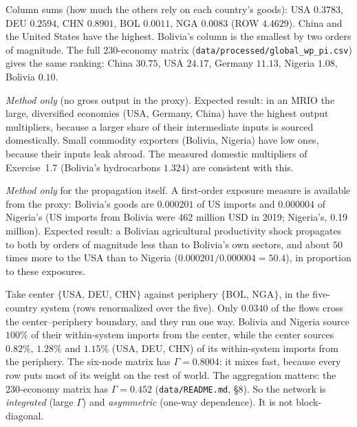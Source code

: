 \documentclass[../solutions_manual.tex]{subfiles}
\begin{document}
 Column sums (how much the others rely on each country's goods): USA $0.3783$, DEU $0.2594$, CHN $0.8901$, BOL $0.0011$, NGA $0.0083$ (ROW $4.4629$). China and the United States have the highest. Bolivia's column is the smallest by two orders of magnitude. The full 230-economy matrix (\texttt{data/processed/global\_wp\_pi.csv}) gives the same ranking: China $30.75$, USA $24.17$, Germany $11.13$, Nigeria $1.08$, Bolivia $0.10$.

 \emph{Method only} (no gross output in the proxy). Expected result: in an MRIO the large, diversified economies (USA, Germany, China) have the highest output multipliers, because a larger share of their intermediate inputs is sourced domestically. Small commodity exporters (Bolivia, Nigeria) have low ones, because their inputs leak abroad. The measured domestic multipliers of Exercise~1.7 (Bolivia's hydrocarbons $1.324$) are consistent with this.

 \emph{Method only} for the propagation itself. A first-order exposure measure is available from the proxy: Bolivia's goods are $0.000201$ of US imports and $0.000004$ of Nigeria's (US imports from Bolivia were 462 million USD in 2019; Nigeria's, 0.19 million). Expected result: a Bolivian agricultural productivity shock propagates to both by orders of magnitude less than to Bolivia's own sectors, and about $50$ times more to the USA than to Nigeria ($0.000201/0.000004 = 50.4$), in proportion to these exposures.

 Take center $\{$USA, DEU, CHN$\}$ against periphery $\{$BOL, NGA$\}$, in the five-country system (rows renormalized over the five). Only $0.0340$ of the flows cross the center--periphery boundary, and they run one way. Bolivia and Nigeria source $100\%$ of their within-system imports from the center, while the center sources $0.82\%$, $1.28\%$ and $1.15\%$ (USA, DEU, CHN) of its within-system imports from the periphery. The six-node matrix has $\Gamma = 0.8004$: it mixes fast, because every row puts most of its weight on the rest of world. The aggregation matters: the 230-economy matrix has $\Gamma = 0.452$ (\texttt{data/README.md}, \S8). So the network is \emph{integrated} (large $\Gamma$) and \emph{asymmetric} (one-way dependence). It is not block-diagonal.
\end{document}
